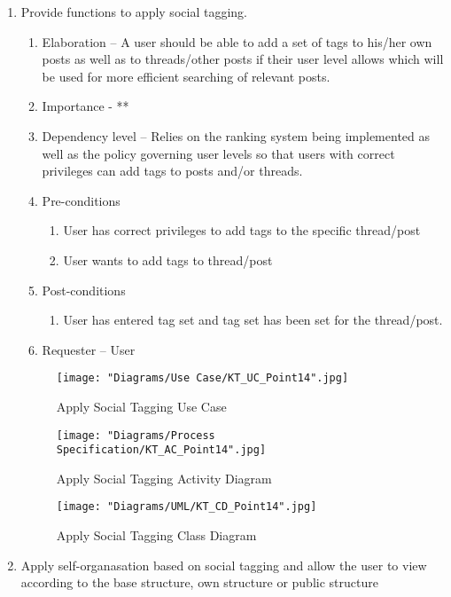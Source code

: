 \documentclass[12pt]{article}
\begin{document}
\begin{enumerate}
\clearpage %
   \item  Provide functions to apply social tagging. %
  \begin{enumerate}
    \item Elaboration – A user should be able to add a set of tags to his/her own posts as well as to threads/other posts if their user level allows which will be used for more efficient searching of relevant posts. 
    \item Importance - **
    \item Dependency level – Relies on the ranking system being implemented as well as the policy governing user levels so that users with correct privileges can add tags to posts and/or threads.
    \item Pre-conditions
    \begin{enumerate}
    	\item User has correct privileges to add tags to the specific thread/post
    	\item User wants to add tags to thread/post
    \end{enumerate}
        \item Post-conditions
    \begin{enumerate}
    	\item User has entered tag set and tag set has been set for the thread/post.
    \end{enumerate}
    \item Requester – User
  \end{enumerate}
\begin{figure}[h]
	\centering
	\texttt{[image: "Diagrams/Use Case/KT\_UC\_Point14".jpg]}
	\caption{Apply Social Tagging Use Case}
\end{figure}
\begin{figure}[h]
	\centering
	\texttt{[image: "Diagrams/Process Specification/KT\_AC\_Point14".jpg]}
	\caption{Apply Social Tagging Activity Diagram}
\end{figure}
\begin{figure}[h]
	\centering
	\texttt{[image: "Diagrams/UML/KT\_CD\_Point14".jpg]}
	\caption{Apply Social Tagging Class Diagram}
\end{figure}
\clearpage %
   \item Apply self-organasation based on social tagging and allow the user to view according to the base structure, own structure or public structure %
  \begin{enumerate}

\end{enumerate}
\end{enumerate}
\end{document}
